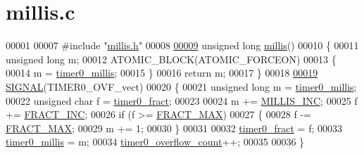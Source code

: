 \hypertarget{millis_8c_source}{}\section{millis.\+c}
\label{millis_8c_source}

\begin{DoxyCode}
00001 
00007 \textcolor{preprocessor}{#include "\hyperlink{millis_8h}{millis.h}"}
00008 
\hypertarget{millis_8c_source.tex_l00009}{}\hyperlink{millis_8h_a6ff7f2532a22366f0013bc41397129fd}{00009} \textcolor{keywordtype}{unsigned} \textcolor{keywordtype}{long} \hyperlink{millis_8c_a6ff7f2532a22366f0013bc41397129fd}{millis}()
00010 \{
00011     \textcolor{keywordtype}{unsigned} \textcolor{keywordtype}{long} m;
00012     ATOMIC\_BLOCK(ATOMIC\_FORCEON)
00013     \{
00014         m = \hyperlink{millis_8h_ab34d3974411fdee7da8c6b4f650502e9}{timer0\_millis};
00015     \}
00016     \textcolor{keywordflow}{return} m;
00017 \}
00018 
\hypertarget{millis_8c_source.tex_l00019}{}\hyperlink{millis_8c_a246b39a3dbbdc17e03e35f022d8101cd}{00019} \hyperlink{millis_8c_a246b39a3dbbdc17e03e35f022d8101cd}{SIGNAL}(TIMER0\_OVF\_vect)
00020 \{
00021     \textcolor{keywordtype}{unsigned} \textcolor{keywordtype}{long} m = \hyperlink{millis_8h_ab34d3974411fdee7da8c6b4f650502e9}{timer0\_millis};
00022     \textcolor{keywordtype}{unsigned} \textcolor{keywordtype}{char} f = \hyperlink{millis_8h_ae7c36fe51c2f3d6dbee84a935ea15420}{timer0\_fract};
00023 
00024     m += \hyperlink{millis_8h_ab640966289e34d6fe31434f37090e6e6}{MILLIS\_INC};
00025     f += \hyperlink{millis_8h_a5647e40017bbd34a202f6a672ca116e4}{FRACT\_INC};
00026     \textcolor{keywordflow}{if} (f >= \hyperlink{millis_8h_a3d5262b0f828700a2ce29198838e0d9e}{FRACT\_MAX})
00027     \{
00028         f -= \hyperlink{millis_8h_a3d5262b0f828700a2ce29198838e0d9e}{FRACT\_MAX};
00029         m += 1;
00030     \}
00031 
00032     \hyperlink{millis_8h_ae7c36fe51c2f3d6dbee84a935ea15420}{timer0\_fract} = f;
00033     \hyperlink{millis_8h_ab34d3974411fdee7da8c6b4f650502e9}{timer0\_millis} = m;
00034     \hyperlink{millis_8h_a79a4c8c254cfb57c6ac3393a396c7a4f}{timer0\_overflow\_count}++;
00035 
00036 \}
\end{DoxyCode}
